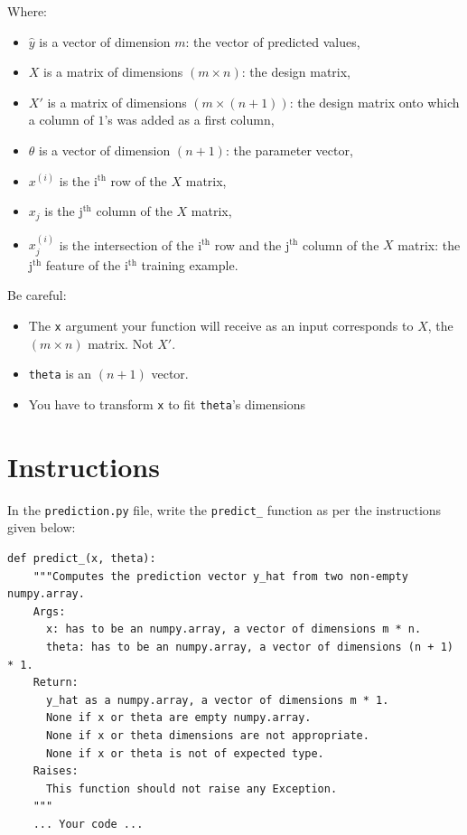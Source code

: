 \documentclass{42-en}
\begin{document}
Where:
\begin{itemize}
  \item $\hat{y}$ is a vector of dimension $m$: the vector of predicted values,
  \item $X$ is a matrix of dimensions $(m \times n)$: the design matrix,
  \item $X'$ is a matrix of dimensions $(m \times (n + 1))$: the design matrix onto which a column of $1$'s was added as a first column,
  \item $\theta$ is a vector of dimension $(n + 1)$: the parameter vector,
  \item $x^{(i)}$ is the i$^\text{th}$ row of the $X$ matrix,
  \item $x_{j}$ is the j$^\text{th}$ column of the $X$ matrix,
  \item $x_j^{(i)}$ is the intersection of the i$^\text{th}$ row and the j$^\text{th}$ column of the $X$ matrix: the j$^\text{th}$ feature of the i$^\text{th}$ training example.
\end{itemize}


Be careful: 
\begin{itemize}
  \item The \texttt{x} argument your function will receive as an input corresponds to $X$, the $(m \times n)$ matrix.
        Not $X'$.
  \item \texttt{theta} is an $(n + 1)$ vector.
  \item You have to transform \texttt{x} to fit \texttt{theta}'s dimensions
\end{itemize}

\section*{Instructions}
In the \texttt{prediction.py} file, write the \texttt{predict\_} function as per the instructions given below:

\begin{verbatim}
def predict_(x, theta):
    """Computes the prediction vector y_hat from two non-empty numpy.array.
    Args:
      x: has to be an numpy.array, a vector of dimensions m * n.
      theta: has to be an numpy.array, a vector of dimensions (n + 1) * 1.
    Return:
      y_hat as a numpy.array, a vector of dimensions m * 1.
      None if x or theta are empty numpy.array.
      None if x or theta dimensions are not appropriate.
      None if x or theta is not of expected type.
    Raises:
      This function should not raise any Exception.
    """
    ... Your code ...
\end{verbatim}
\end{document}

